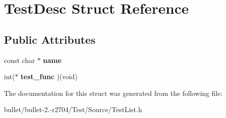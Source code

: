 \hypertarget{struct_test_desc}{\section{Test\+Desc Struct Reference}
\label{struct_test_desc}
}
\subsection*{Public Attributes}
\begin{DoxyCompactItemize}
\item 
\hypertarget{struct_test_desc_a0d1cfcfe6a9f49b5dbd98d57696e6120}{const char $\ast$ {\bfseries name}}\label{struct_test_desc_a0d1cfcfe6a9f49b5dbd98d57696e6120}

\item 
\hypertarget{struct_test_desc_a7c877bef1c91369dd9e01d51eceea5c9}{int($\ast$ {\bfseries test\+\_\+func} )(void)}\label{struct_test_desc_a7c877bef1c91369dd9e01d51eceea5c9}

\end{DoxyCompactItemize}


The documentation for this struct was generated from the following file\+:\begin{DoxyCompactItemize}
\item 
bullet/bullet-\/2.-\/r2704/\+Test/\+Source/Test\+List.\+h\end{DoxyCompactItemize}
